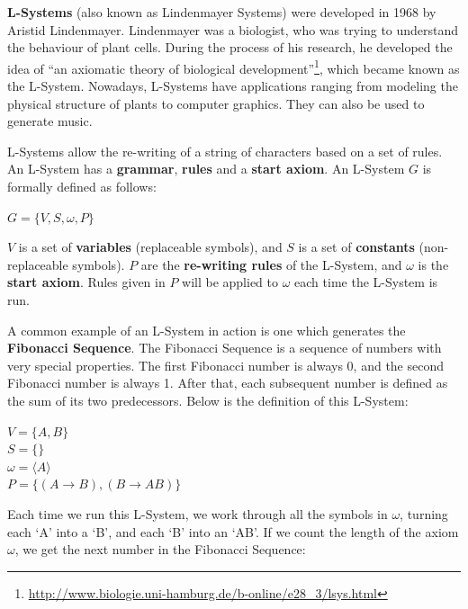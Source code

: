 \textbf{L-Systems} (also known as Lindenmayer Systems) were developed in 1968 by Aristid Lindenmayer. Lindenmayer was a biologist, who was trying to understand the behaviour of plant cells. During the process of his research, he developed the idea of ``an axiomatic theory of biological development''\footnote{\url{http://www.biologie.uni-hamburg.de/b-online/e28_3/lsys.html}}, which became known as the L-System. Nowadays, L-Systems have applications ranging from modeling the physical structure of plants to computer graphics. They can also be used to generate music.

L-Systems allow the re-writing of a string of characters based on a set of rules. An L-System has a \textbf{grammar}, \textbf{rules} and a \textbf{start axiom}. An L-System $G$ is formally defined as follows:

\begin{singlespace}
\begin{formality}
$G = \{ V, S, \omega, P \}$
\end{formality}
\end{singlespace}

$V$ is a set of \textbf{variables} (replaceable symbols), and $S$ is a set of \textbf{constants} (non-replaceable symbols). $P$ are the \textbf{re-writing rules} of the L-System, and $\omega$ is the \textbf{start axiom}. Rules given in $P$ will be applied to $\omega$ each time the L-System is run. 

A common example of an L-System in action is one which generates the \textbf{Fibonacci Sequence}. The Fibonacci Sequence is a sequence of numbers with very special properties. The first Fibonacci number is always 0, and the second Fibonacci number is always 1. After that, each subsequent number is defined as the sum of its two predecessors. Below is the definition of this L-System:

\begin{singlespace}
\begin{formality}
$V = \{ A, B \}$ \\
$S = \{\}$ \\
$\omega = \langle A \rangle$ \\
$P = \{ (A \rightarrow B), (B \rightarrow AB) \}$
\end{formality}
\end{singlespace}

Each time we run this L-System, we work through all the symbols in $\omega$, turning each `A'  into a `B', and each `B' into an `AB'. If we count the length of the axiom $\omega$, we get the next number in the Fibonacci Sequence:

